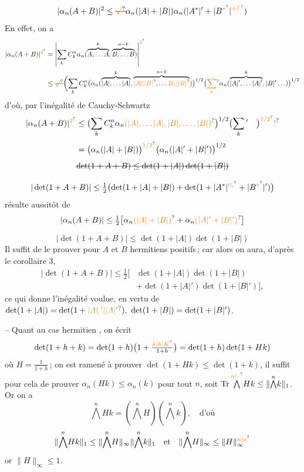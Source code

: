 \[
|\alpha_n(A+B)|^2\leq\deleted{\unsure{\sqrt{\vphantom A}}}\alpha_n(|A|+|B|)
\alpha_n(|A^*|'+|B^{\unsure{*}}|^{\unsure{+|'}})
\]
En effet, on a 
\[
\begin{aligned}
|\alpha_n(A+B)|^{\unsure{2}}&=\left|\sum_k C_k^n\alpha_n(\overbrace{A,\ldots A}^{k},
\overbrace{B,\ldots B}^{n-k})\right|^{\unsure{2}}\\
&\leq\deleted{\unsure{\surd}}\biggl(\sum_k C_k^n
\bigl(\alpha_n(\overbrace{|A|,\ldots |A|}^{k},\overbrace{\unsure{|A||\lvert B\rvert},\ldots\unsure{B_1|\lvert B\rvert}}^{n-k})\bigr)^{1/2}
\bigl(\unsure{\sum_k}\alpha_n(\overbrace{|A|',\ldots |A|'}^{k},|B|'\ldots)\bigr)^{1/2}
\end{aligned}
\]
d'où, par l'inégalité de Cauchy-Schwartz
\[
|\alpha_n(A+B)|^{\unsure{2}}\leq\bigl(\sum_k C_k^n\alpha_n\unsure{(|A|,\ldots |A|,|B|,\ldots,|B|)}\bigr)^{1/2}
\bigl(\sum_k{}'\quad\bigr)^{\unsure{1/2}}\unsure{!}
\]
\[
=\bigl(\alpha_n(|A|+|B|)\bigr)^{\unsure{1/2}}\bigl(\alpha_n(|A|'+|B|')\bigr)^{1/2}
\]
\[
\deleted{\det(1+A+B)\leq\det(1+|A|)\det(1+|B|)}
\]

\[
|\det(1+A+B)|\leq\tfrac12\bigl(\det(1+|A|+|B|)+\det(1+|A^*|^{\unsure{\prime|,}}+|B^{\unsure{*}}|')\bigr)
\]
résulte aussitôt de
\[
|\alpha_n(A+B)|\leq\tfrac12\bigl[\alpha_n\unsure{(|A|+|B|)}+\alpha_n\unsure{(|A|'+|B|')}\bigr]
\]

\[
\boxed{|\det(1+A+B)|\leq\det(1+|A|)\det(1+|B|)}
\]
Il suffit de  le prouver pour $A$ et $B$
hermitiens positifs\,; car alors on aura, d'après
le corollaire 3,
\[
\begin{aligned}
|\det(1+A+B)|\leq\tfrac12\bigl[&\det(1+|A|)\det(1+|B|)\\
&+\det(1+|A|')\det(1+|B|')\bigr],
\end{aligned}
\]
ce qui donne l'inégalité voulue, en vertu de
$\det(1+|A|)=\det(1+\unsure{\lvert A(\,{}'|\lvert A\rvert'}),\ \det(1+|B|)=\det(1+|B|')$.

-- Quant au cas hermitien , on écrit
\[
\det(1+h+k)=\det(1+h)\bigl(1+\tfrac{\unsure{k|h|K}}{1+h}\bigr)=\det(1+h)\det(1+Hk)
\]
où $H=\frac{1}{1+h}$\,; on est ramené à prouver
$\det(1+Hk)\leq\det(1+k)$, il suffit pour cela
de prouver $\alpha_n(Hk)\leq\alpha_n(k)$ pour tout $n$,
soit $\operatorname{Tr}\overset{\unsure{n|\text{--}}}{\bigwedge}Hk\leq\|\overset{n}{\bigwedge}k\|_1$. Or on a
\[
\overset{n}{\bigwedge}Hk=(\overset{n}{\bigwedge}H)(\overset{n}{\bigwedge}k),\quad\text{d'où}
\]
\[
\|\overset{n}{\bigwedge}Hk\|_1\leq\|\overset{n}{\bigwedge}H\|_\infty\|\overset{n}{\bigwedge}k\|_1
\quad\text{et}\quad\|\overset{n}{\bigwedge}H\|_\infty\leq\|H\|_\infty^{\unsure{n|a}}
\]
\margin{\unsure{!}}or $\|H\|_\infty\leq1$.

